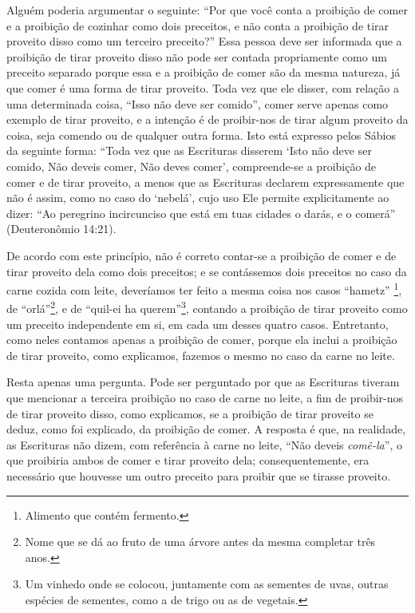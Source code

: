 Alguém poderia argumentar o seguinte: ``Por que você conta a proibição
de comer e a proibição de cozinhar como dois preceitos, e não conta a
proibição de tirar proveito disso como um terceiro preceito?'' Essa
pessoa deve ser informada que a proibição de tirar proveito disso não
pode ser contada propriamente como um preceito separado porque essa e a
proibição de comer são da mesma natureza, já que comer é uma forma de
tirar proveito. Toda vez que ele disser, com relação a uma determinada
coisa, ``Isso não deve ser comido'', comer serve apenas como exemplo de
tirar proveito, e a intenção é de proibir-nos de tirar algum proveito da
coisa, seja comendo ou de qualquer outra forma. Isto está expresso pelos
Sábios da seguinte forma: ``Toda vez que as Escrituras disserem `Isto
não deve ser comido, Não deveis comer, Não deves comer', compreende-se a
proibição de comer e de tirar proveito, a menos que as Escrituras
declarem expressamente que não é assim, como no caso do `nebelá', cujo
uso Ele permite explicitamente ao dizer: ``Ao peregrino incircunciso que está em tuas cidades o darás, e o comerá'' (Deuteronômio 14:21).

De acordo com este princípio, não é correto contar-se a proibição de
comer e de tirar proveito dela como dois preceitos; e se contássemos
dois preceitos no caso da carne cozida com leite, deveríamos ter feito a
mesma coisa nos casos ``hametz'' \footnote{Alimento que contém fermento.}, de
``orlá''\footnote{Nome que se dá ao fruto de uma árvore antes da mesma completar três
  anos.}, e de ``quil-ei ha
querem''\footnote{Um vinhedo onde se colocou, juntamente com as sementes de uvas,
  outras espécies de sementes, como a de trigo ou as de vegetais.}, contando a proibição de tirar proveito
como um preceito independente em si, em cada um desses quatro casos.
Entretanto, como neles contamos apenas a proibição de comer, porque ela
inclui a proibição de tirar proveito, como explicamos, fazemos o mesmo
no caso da carne no leite.

Resta apenas uma pergunta. Pode ser perguntado por que as Escrituras
tiveram que mencionar a terceira proibição no caso de carne no leite, a
fim de proibir-nos de tirar proveito disso, como explicamos, se a
proibição de tirar proveito se deduz, como foi explicado, da proibição
de comer. A resposta é que, na realidade, as Escrituras não dizem, com
referência à carne no leite, ``Não deveis \emph{comê-la}'', o que
proibiria ambos de comer e tirar proveito dela; consequentemente, era
necessário que houvesse um outro preceito para proibir que se tirasse
proveito.

